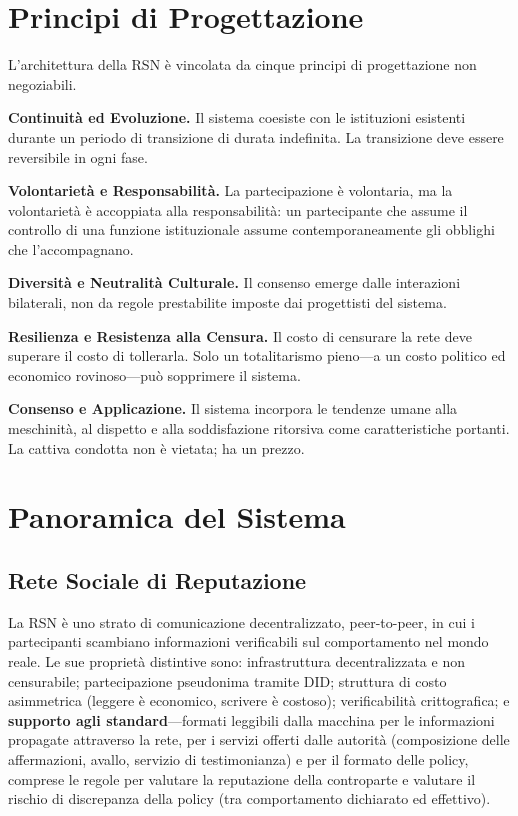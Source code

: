 \documentclass[11pt,a4paper,twocolumn]{article}
\begin{document}
\section{Principi di Progettazione}

L'architettura della RSN è vincolata da cinque principi di progettazione non negoziabili.

\textbf{Continuità ed Evoluzione.} Il sistema coesiste con le istituzioni esistenti durante un periodo di transizione di durata indefinita. La transizione deve essere reversibile in ogni fase.

\textbf{Volontarietà e Responsabilità.} La partecipazione è volontaria, ma la volontarietà è accoppiata alla responsabilità: un partecipante che assume il controllo di una funzione istituzionale assume contemporaneamente gli obblighi che l'accompagnano.

\textbf{Diversità e Neutralità Culturale.} Il consenso emerge dalle interazioni bilaterali, non da regole prestabilite imposte dai progettisti del sistema.

\textbf{Resilienza e Resistenza alla Censura.} Il costo di censurare la rete deve superare il costo di tollerarla. Solo un totalitarismo pieno---a un costo politico ed economico rovinoso---può sopprimere il sistema.

\textbf{Consenso e Applicazione.} Il sistema incorpora le tendenze umane alla meschinità, al dispetto e alla soddisfazione ritorsiva come caratteristiche portanti. La cattiva condotta non è vietata; ha un prezzo.

\section{Panoramica del Sistema}

\subsection{Rete Sociale di Reputazione}

La RSN è uno strato di comunicazione decentralizzato, peer-to-peer, in cui i partecipanti scambiano informazioni verificabili sul comportamento nel mondo reale. Le sue proprietà distintive sono: infrastruttura decentralizzata e non censurabile; partecipazione pseudonima tramite DID; struttura di costo asimmetrica (leggere è economico, scrivere è costoso); verificabilità crittografica; e \textbf{supporto agli standard}---formati leggibili dalla macchina per le informazioni propagate attraverso la rete, per i servizi offerti dalle autorità (composizione delle affermazioni, avallo, servizio di testimonianza) e per il formato delle policy, comprese le regole per valutare la reputazione della controparte e valutare il rischio di discrepanza della policy (tra comportamento dichiarato ed effettivo).
\end{document}
